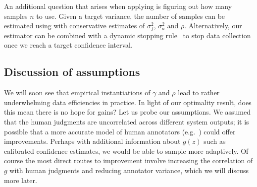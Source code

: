 An additional question that arises when applying  is figuring out how many samples $n$ to use.
Given a target variance, the number of samples can be estimated using  with conservative estimates of $\sigma^2_f$, $\sigma^2_a$ and $\rho$.
Alternatively, our estimator can be combined with a dynamic stopping rule~\citep{mnih2008empirical} to stop data collection once we reach a target confidence interval.

\subsection{Discussion of assumptions}
We will soon see that empirical instantiations of $\gamma$ and $\rho$ lead to rather underwhelming data efficiencies in practice.
In light of our optimality result, does this mean there is no hope for gains?
Let us probe our assumptions.
We assumed that the human judgments are uncorrelated across different system outputs;
it is possible that a more accurate model of human annotators (e.g.\ \citet{passonneau2014benefits}) could offer improvements.
Perhaps with additional information about $g(z)$ such as calibrated confidence estimates,
we would be able to sample more adaptively.
Of course the most direct routes to improvement involve increasing the correlation of $g$ with human judgments and reducing annotator variance,
which we will discuss more later.





